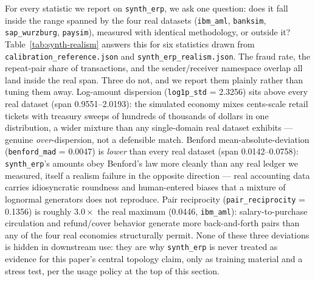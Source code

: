 For every statistic we report on \texttt{synth\_erp}, we ask one question:
does it fall inside the range spanned by the four real datasets
(\texttt{ibm\_aml}, \texttt{banksim}, \texttt{sap\_wurzburg}, \texttt{paysim}),
measured with identical methodology, or outside it? Table~\ref{tab:synth-realism}
answers this for six statistics drawn from \texttt{calibration\_reference.json}
and \texttt{synth\_erp\_realism.json}. The fraud rate, the repeat-pair share
of transactions, and the sender/receiver namespace overlap all land inside
the real span. Three do not, and we report them plainly rather than tuning
them away. Log-amount dispersion (\texttt{log1p\_std} = 2.3256) sits above
every real dataset (span 0.9551--2.0193): the simulated economy mixes
cents-scale retail tickets with treasury sweeps of hundreds of thousands of
dollars in one distribution, a wider mixture than any single-domain real
dataset exhibits — genuine \emph{over}-dispersion, not a defensible match.
Benford mean-absolute-deviation (\texttt{benford\_mad} = 0.0047) is
\emph{lower} than every real dataset (span 0.0142--0.0758): \texttt{synth\_erp}'s
amounts obey Benford's law more cleanly than any real ledger we measured,
itself a realism failure in the opposite direction — real accounting data
carries idiosyncratic roundness and human-entered biases that a mixture of
lognormal generators does not reproduce. Pair reciprocity
(\texttt{pair\_reciprocity} = 0.1356) is roughly $3.0\times$ the real maximum
(0.0446, \texttt{ibm\_aml}): salary-to-purchase circulation and refund/cover
behavior generate more back-and-forth pairs than any of the four real
economies structurally permit. None of these three deviations is hidden in
downstream use: they are why \texttt{synth\_erp} is never treated as evidence
for this paper's central topology claim, only as training material and a
stress test, per the usage policy at the top of this section.


